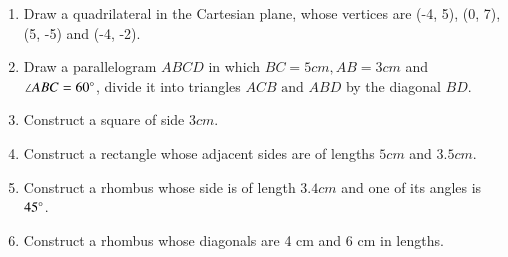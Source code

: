 \begin{enumerate}[label=\thesection.\arabic*,ref=\thesection.\theenumi]
	\item Draw a quadrilateral in the Cartesian plane, whose vertices are (-4, 5), (0, 7), (5, -5) and (-4, -2). 
\item Draw a parallelogram ${ABCD}$ in which $BC=5 cm, AB=3 cm$ and $\angle{ABC}=60\degree$, divide it into triangles ${ACB}\text{ and }{ABD}$ by the diagonal $BD$. 
\item Construct a square of side $3 cm$.
\item Construct  a rectangle whose adjacent sides are of lengths $5 cm$ and $3.5 cm$.
\item Construct a rhombus whose side is of length $3.4 cm$ and one of its angles is $45\degree$.
\item Construct a rhombus whose diagonals are 4 cm and 6 cm in lengths.
\end{enumerate}
